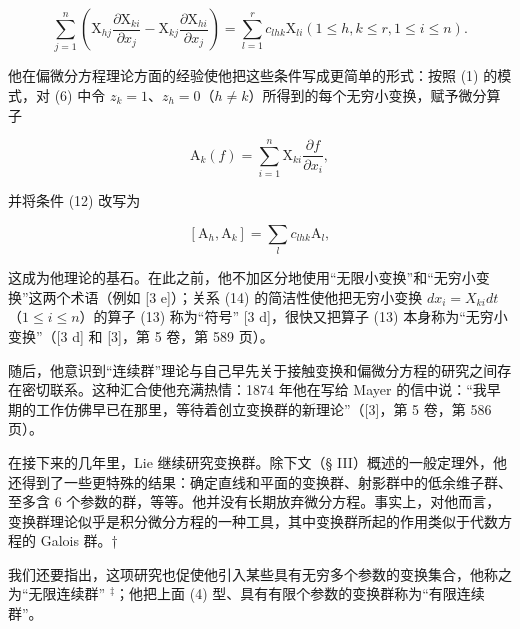 \[
\sum_ {j = 1} ^ {n} \left(\mathrm{X} _ {h j} \frac {\partial \mathrm{X} _ {k i}}{\partial x _ {j}} - \mathrm{X} _ {k j} \frac {\partial \mathrm{X} _ {h i}}{\partial x _ {j}}\right) = \sum_ {l = 1} ^ {r} c _ {l h k} \mathrm{X} _ {l i} (1 \leqslant h, k \leqslant r, 1 \leqslant i \leqslant n). \tag{12}
\]

他在偏微分方程理论方面的经验使他把这些条件写成更简单的形式：按照 (1) 的模式，对 (6) 中令 \(z_{k} = 1\)、\(z_{h} = 0\)（\(h \neq k\)）所得到的每个无穷小变换，赋予微分算子

\[
\mathrm{A} _ {k} (f) = \sum_ {i = 1} ^ {n} \mathrm{X} _ {k i} \frac {\partial f}{\partial x _ {i}},\tag{13}
\]

并将条件 (12) 改写为

\[
[ \mathrm{A} _ {h}, \mathrm{A} _ {k} ] = \sum_ {l} c _ {l h k} \mathrm{A} _ {l},\tag{14}
\]

这成为他理论的基石。在此之前，他不加区分地使用“无限小变换”和“无穷小变换”这两个术语（例如 {[}3 e{]}）；关系 (14) 的简洁性使他把无穷小变换 \(dx_{i} = X_{ki}dt\)（\(1 \leqslant i \leqslant n\)）的算子 (13) 称为“符号” {[}3 d{]}，很快又把算子 (13) 本身称为“无穷小变换”（{[}3 d{]} 和 {[}3{]}，第 5 卷，第 589 页）。

随后，他意识到“连续群”理论与自己早先关于接触变换和偏微分方程的研究之间存在密切联系。这种汇合使他充满热情：1874 年他在写给 Mayer 的信中说：“我早期的工作仿佛早已在那里，等待着创立变换群的新理论”（{[}3{]}，第 5 卷，第 586 页）。

在接下来的几年里，Lie 继续研究变换群。除下文（§ III）概述的一般定理外，他还得到了一些更特殊的结果：确定直线和平面的变换群、射影群中的低余维子群、至多含 6 个参数的群，等等。他并没有长期放弃微分方程。事实上，对他而言，变换群理论似乎是积分微分方程的一种工具，其中变换群所起的作用类似于代数方程的 Galois 群。†

我们还要指出，这项研究也促使他引入某些具有无穷多个参数的变换集合，他称之为“无限连续群” \(^{‡}\)；他把上面 (4) 型、具有有限个参数的变换群称为“有限连续群”。

